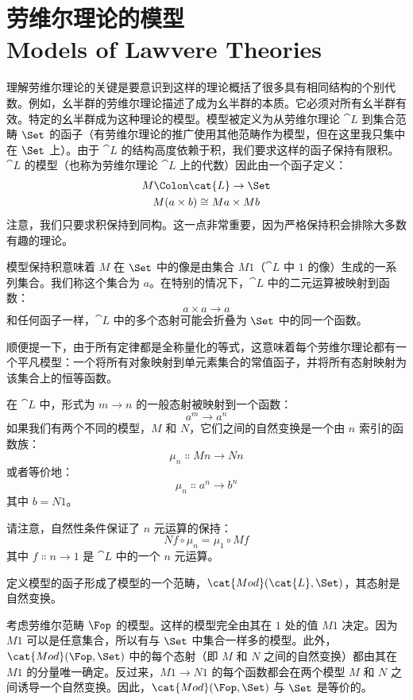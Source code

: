 \section{劳维尔理论的模型\\ \textmd{Models of Lawvere Theories}}

理解劳维尔理论的关键是要意识到这样的理论概括了很多具有相同结构的个别代数。例如，幺半群的劳维尔理论描述了成为幺半群的本质。它必须对所有幺半群有效。特定的幺半群成为这种理论的模型。模型被定义为从劳维尔理论 $\cat{L}$ 到集合范畴 $\Set$ 的函子（有劳维尔理论的推广使用其他范畴作为模型，但在这里我只集中在 $\Set$ 上）。由于 $\cat{L}$ 的结构高度依赖于积，我们要求这样的函子保持有限积。$\cat{L}$ 的模型（也称为劳维尔理论 $\cat{L}$ 上的代数）因此由一个函子定义：
\begin{gather*}
  M \Colon \cat{L} \to \Set \\
  M (a \times b) \cong M a \times M b
\end{gather*}
注意，我们只要求积保持到同构。这一点非常重要，因为严格保持积会排除大多数有趣的理论。

模型保持积意味着 $M$ 在 $\Set$ 中的像是由集合 $M 1$（$\cat{L}$ 中 $1$ 的像）生成的一系列集合。我们称这个集合为 $a$。在特别的情况下，$\cat{L}$ 中的二元运算被映射到函数：
\[a \times a \to a\]
和任何函子一样，$\cat{L}$ 中的多个态射可能会折叠为 $\Set$ 中的同一个函数。

顺便提一下，由于所有定律都是全称量化的等式，这意味着每个劳维尔理论都有一个平凡模型：一个将所有对象映射到单元素集合的常值函子，并将所有态射映射为该集合上的恒等函数。

在 $\cat{L}$ 中，形式为 $m \to n$ 的一般态射被映射到一个函数：
\[a^m \to a^n\]
如果我们有两个不同的模型，$M$ 和 $N$，它们之间的自然变换是一个由 $n$ 索引的函数族：
\[\mu_n \Colon M n \to N n\]
或者等价地：
\[\mu_n \Colon a^n \to b^n\]
其中 $b = N 1$。

请注意，自然性条件保证了 $n$ 元运算的保持：
\[N f \circ \mu_n = \mu_1 \circ M f\]
其中 $f \Colon n \to 1$ 是 $\cat{L}$ 中的一个 $n$ 元运算。

定义模型的函子形成了模型的一个范畴，$\cat{Mod}(\cat{L}, \Set)$，其态射是自然变换。

考虑劳维尔范畴 $\Fop$ 的模型。这样的模型完全由其在 $1$ 处的值 $M 1$ 决定。因为 $M 1$ 可以是任意集合，所以有与 $\Set$ 中集合一样多的模型。此外，$\cat{Mod}(\Fop, \Set)$ 中的每个态射（即 $M$ 和 $N$ 之间的自然变换）都由其在 $M 1$ 的分量唯一确定。反过来，$M 1 \to N 1$ 的每个函数都会在两个模型 $M$ 和 $N$ 之间诱导一个自然变换。因此，$\cat{Mod}(\Fop, \Set)$ 与 $\Set$ 是等价的。

